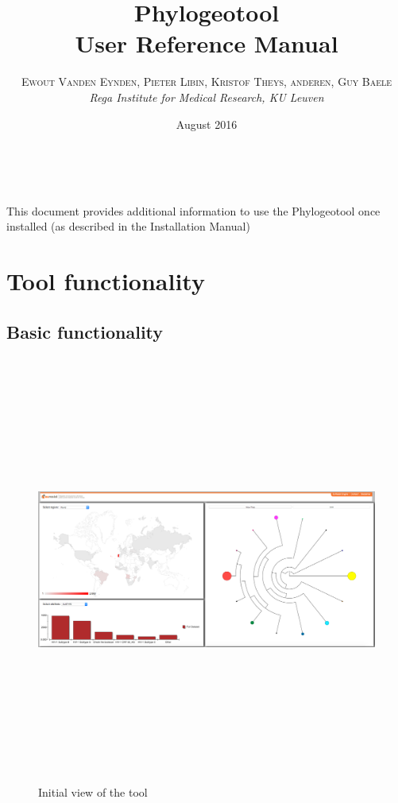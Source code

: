 \documentclass[a4paper, 11pt]{article} %
\title{\textbf{Phylogeotool}\\ %
User Reference Manual} %
\author{\textsc{Ewout Vanden Eynden, Pieter Libin, Kristof Theys, anderen, Guy Baele} %
\\{\textit{Rega Institute for Medical Research, KU Leuven}}} %
\date{August 2016} %
\makeatletter
\renewcommand{\maketitle}{ %
\begin{flushright} %
{\LARGE\@title} %

\vspace{50pt} %

{\large\@author} %
\\\@date %

\vspace{40pt} %
\end{flushright}
}
\makeatother
\begin{document}
\maketitle %

\vspace{30pt} %

\tableofcontents
\newpage

This document provides additional information to use the Phylogeotool once installed (as described in the Installation Manual)

\section{Tool functionality}
\subsection{Basic functionality}

\begin{figure}[H]
\centering
\includegraphics[width=400pt, height=400pt, keepaspectratio=true]{images/initial_view.PNG}
\caption{Initial view of the tool}
\label{fig:initial_view}
\end{figure}
\end{document}
